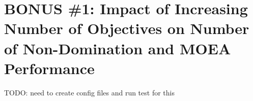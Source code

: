 \documentclass[11pt]{article}
\newcommand{\fitnessplotcaption}[1]{\caption{Evaluations versus Average Local Fitness and Evaluations versus 
    Local Best Fitness for the \textbf{{#1}}, Averaged Over All Runs}}
\newcommand{\addgraphic}[1]{\centerline{\texttt{[image: report/figures/\{\#1]}.png}}}
\begin{document}
\section{BONUS \#1: Impact of Increasing Number of Objectives on Number of Non-Domination and MOEA Performance}

TODO: need to create config files and run test for this

\end{document}
